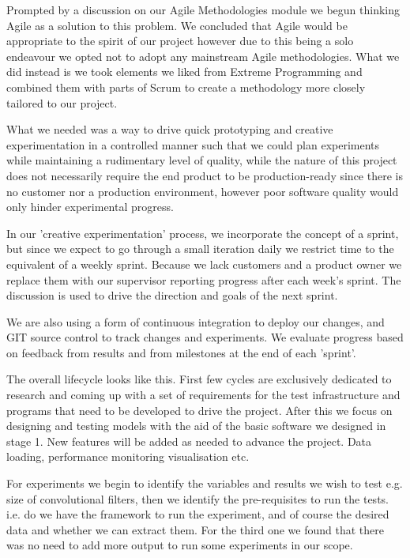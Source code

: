 Prompted by a discussion on our Agile Methodologies module we begun thinking Agile as a solution to this problem. We concluded that Agile would be appropriate to the spirit of our project however due to this being a solo endeavour we opted not to adopt any mainstream Agile methodologies. What we did instead is we took elements we liked from Extreme Programming and combined them with parts of Scrum to create a methodology more closely tailored to our project.

What we needed was a way to drive quick prototyping and creative experimentation in a controlled manner such that we could plan experiments while maintaining a rudimentary level of quality, while the nature of this project does not necessarily require the end product to be production-ready since there is no customer nor a production environment, however poor software quality would only hinder experimental progress.

In our 'creative experimentation' process, we incorporate the concept of a sprint, but since we expect to go through a small iteration daily we restrict time to the equivalent of a weekly sprint. Because we lack customers and a product owner we replace them with our supervisor reporting progress after each week's sprint. The discussion is used to drive the direction and goals of the next sprint.

We are also using a form of continuous integration to deploy our changes, and GIT source control to track changes and experiments. We evaluate progress based on feedback from results and from milestones at the end of each 'sprint'.

The overall lifecycle looks like this. First few cycles are exclusively dedicated to research and coming up with a set of requirements for the test infrastructure and programs that need to be developed to drive the project. After this we focus on designing and testing models with the aid of the basic software we designed in stage 1. New features will be added as needed to advance the project. Data loading, performance monitoring visualisation etc.

For experiments we begin to identify the variables and results we wish to test e.g. size of convolutional filters, then we identify the pre-requisites to run the tests. i.e. do we have the framework to run the experiment, and of course the desired data and whether we can extract them. For the third one we found that there was no need to add more output to run some experiments in our scope. 